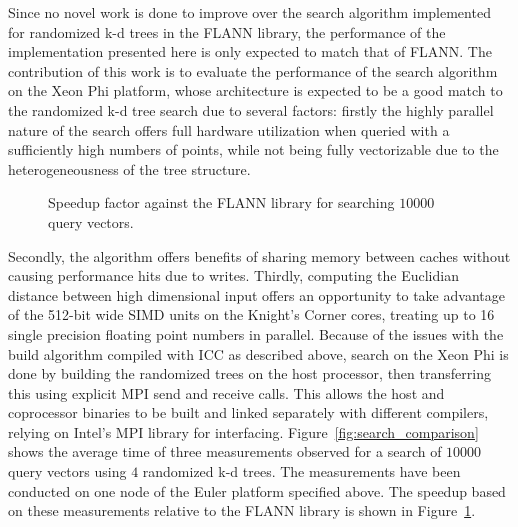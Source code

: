    Since no novel work is done to improve over the 
  search algorithm implemented for randomized k-d trees in the FLANN library, 
  the performance of the implementation presented here is only expected to 
  match that of FLANN. The contribution of this work is to evaluate the 
  performance of the search algorithm on the Xeon Phi platform, whose 
  architecture is expected to be a good match to the randomized k-d tree search 
  due to several factors: firstly the highly parallel nature of the search 
  offers full hardware utilization when queried with a sufficiently high 
  numbers of points, while not being fully vectorizable due to the 
  heterogeneousness of the tree structure.
  \begin{figure}[tb]
    \centering
    \resizebox{\columnwidth}{!}{}
    \caption{Speedup factor against the FLANN library for searching $10000$ 
    query vectors.}
    \label{fig:search_speedup}
  \end{figure}
  Secondly, the algorithm offers benefits of sharing memory between caches 
  without causing performance hits due to writes. Thirdly, computing the 
  Euclidian distance between high dimensional input offers an opportunity to 
  take advantage of the 512-bit wide SIMD units on the Knight's Corner cores, 
  treating up to 16 single precision floating point numbers in parallel.  
  Because of the issues with the build algorithm compiled with ICC as described 
  above, search on the Xeon Phi is done by building the randomized trees on the 
  host processor, then transferring this using explicit MPI send and receive 
  calls. This allows the host and coprocessor binaries to be built and linked 
  separately with different compilers, relying on Intel's MPI library for 
  interfacing.
  Figure~\ref{fig:search_comparison} shows the average time of three 
  measurements observed for a search of $10000$ query vectors using $4$ 
  randomized k-d trees.  The measurements have been conducted on one node of 
  the Euler platform specified above.  The speedup based on these measurements 
  relative to the FLANN library is shown in Figure~\ref{fig:search_speedup}.

